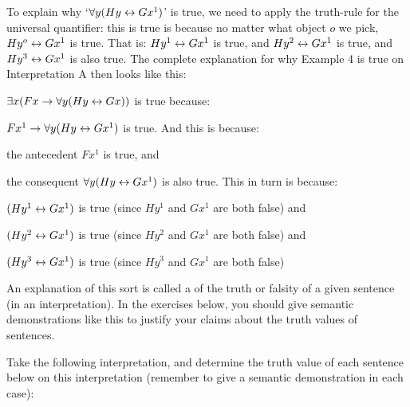 To explain why `$\forall y(Hy \leftrightarrow Gx^1)$'  is true, we need to apply the truth-rule for the universal quantifier: this is true is because no matter what object $o$  we pick, $Hy^o \leftrightarrow Gx^1$ is true.  That is:  $Hy^1 \leftrightarrow Gx^1$ is true, and $Hy^2 \leftrightarrow Gx^1$ is true, and $Hy^3 \leftrightarrow Gx^1$ is  also true. The complete explanation for why Example 4 is true on Interpretation A then looks like this:


\begin{etriangle}
\item $\exists x(Fx \rightarrow \forall y(Hy \leftrightarrow Gx))$ is true because:
\begin{etriangle}
\item $Fx^1 \rightarrow \forall y(Hy \leftrightarrow Gx^1)$ is true.  And this is because:
\begin{etriangle}
\item the antecedent $Fx^1$ is true, and
\item the consequent $\forall y(Hy \leftrightarrow Gx^1)$ is also true. This in turn is because:
\begin{etriangle}
\item $(Hy^1 \leftrightarrow Gx^1)$ is true (since $Hy^1$ and $Gx^1$ are both false) and
\item $(Hy^2 \leftrightarrow Gx^1)$ is true (since $Hy^2$ and $Gx^1$ are both false) and
\item $(Hy^3 \leftrightarrow Gx^1)$ is true (since $Hy^3$ and $Gx^1$ are both false)
\end{etriangle}
\end{etriangle}
\end{etriangle}
\end{etriangle}


An explanation of this sort is called a  of the truth or falsity of a given sentence (in an interpretation).  In the exercises below, you should give semantic demonstrations like this to justify your claims about the truth values of sentences.



\practiceproblems

\problempart Take the following interpretation, and determine the truth value of each sentence below on this interpretation (remember to give a semantic demonstration in each case):\\

